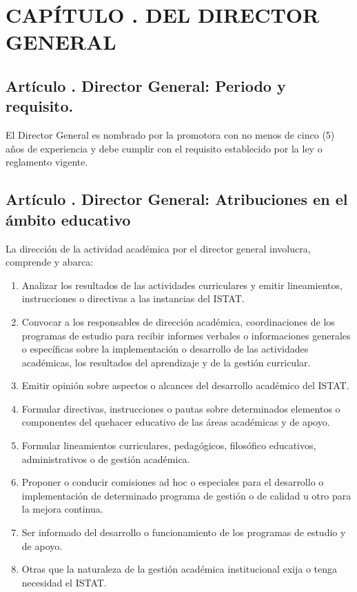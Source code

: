 \section{CAPÍTULO . DEL DIRECTOR GENERAL}
\addtocounter{re}{1}
\subsection{Artículo . Director General: Periodo y requisito.}
\addtocounter{ns}{1}
El Director General es nombrado por la promotora con no menos de cinco (5) años de experiencia y debe cumplir con el requisito establecido por la ley o reglamento vigente.
\subsection{Artículo . Director General: Atribuciones en el ámbito educativo}
\addtocounter{ns}{1}
La dirección de la actividad académica por el director general involucra, comprende y abarca: 
\begin{enumerate}
\item Analizar los resultados de las actividades curriculares y emitir lineamientos, instrucciones o directivas a las instancias del ISTAT. 
\item Convocar a los responsables de dirección académica, coordinaciones de los programas de estudio para recibir informes verbales o informaciones generales o específicas sobre la implementación o desarrollo de las actividades académicas, los resultados del aprendizaje y de la gestión curricular. 
\item Emitir opinión sobre aspectos o alcances del desarrollo académico del ISTAT. 
\item Formular directivas, instrucciones o pautas sobre determinados elementos o componentes del quehacer educativo de las áreas académicas y de apoyo. 
\item Formular lineamientos curriculares, pedagógicos, filosófico educativos, administrativos o de gestión académica. 
\item Proponer o conducir comisiones ad hoc o especiales para el desarrollo o implementación de determinado programa de gestión o de calidad u otro para la mejora continua. 
\item Ser informado del desarrollo o funcionamiento de los programas de estudio y de apoyo. 
\item Otras que la naturaleza de la gestión académica institucional exija o tenga necesidad el ISTAT. 
\end{enumerate}
